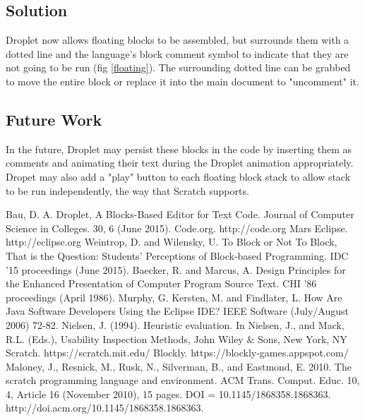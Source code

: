 \documentclass[conference]{IEEEtran}
\begin{document}
\subsection{Solution}
Droplet now allows floating blocks to be assembled, but surrounds them with a dotted line and the language's block comment symbol to indicate that they are not going to be run (fig \ref{floating}). The surrounding dotted line can be grabbed to move the entire block or replace it into the main document to "uncomment" it.

\subsection{Future Work}
In the future, Droplet may persist these blocks in the code by inserting them as comments and animating their text during the Droplet animation appropriately. Dropet may also add a "play" button to each floating block stack to allow stack to be run independently, the way that Scratch supports.

\begin{thebibliography}{1}

  Bau, D. A. Droplet, A Blocks-Based Editor for Text Code. Journal of Computer Science in Colleges. 30, 6 (June 2015).
  Code.org. http://code.org
  Mars Eclipse. http://eclipse.org
  Weintrop, D. and Wilensky, U. To Block or Not To Block, That is the Question: Students' Perceptions of Block-based Programming. IDC '15 proceedings (June 2015).
  Baecker, R. and Marcus, A. Design Principles for the Enhanced Presentation of Computer Program Source Text. CHI '86 proceedings (April 1986).
  Murphy, G. Kersten, M. and Findlater, L. How Are Java Software Developers Using the Eclipse IDE? IEEE Software (July/August 2006) 72-82.
  Nielsen, J. (1994). Heuristic evaluation. In Nielsen, J., and Mack, R.L. (Eds.), Usability Inspection Methods, John Wiley \& Sons, New York, NY
  Scratch. https://scratch.mit.edu/
  Blockly. https://blockly-games.appspot.com/
  Maloney, J., Resnick, M., Rusk, N., Silverman, B., and Eastmond, E. 2010. The scratch programming language and environment. ACM Trans. Comput. Educ. 10, 4, Article 16 (November 2010), 15 pages. DOI = 10.1145/1868358.1868363. http://doi.acm.org/10.1145/1868358.1868363.

\end{thebibliography}

\end{document}
